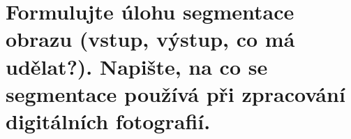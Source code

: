 \section{Formulujte úlohu segmentace obrazu (vstup, výstup, co má udělat?). Napište, na co se segmentace používá při 
zpracování digitálních fotografií.}